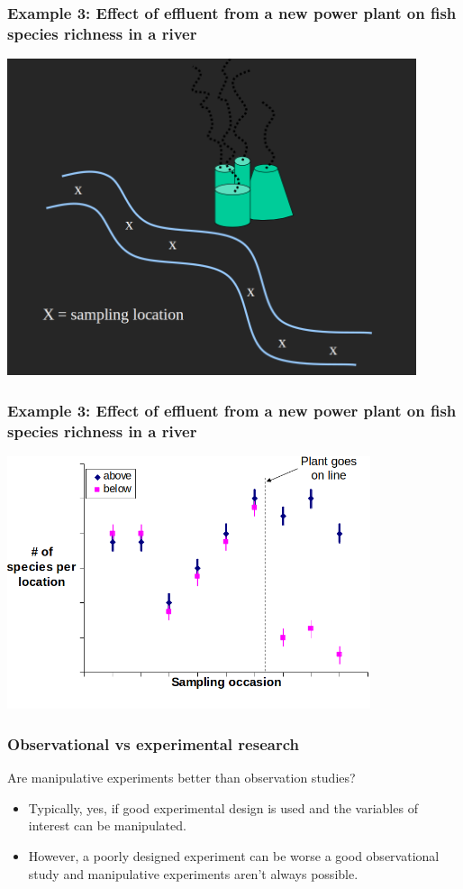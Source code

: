 \documentclass[color=usenames,dvipsnames]{beamer}\usepackage[]{graphicx}\usepackage[]{color}
\begin{document}
\begin{frame}
  \frametitle{Example 3: Effect of effluent from a new power plant on
    fish species richness in a river}
  \centering
  \includegraphics[width=0.9\textwidth]{power-plant-river} \\
\end{frame}


\begin{frame}
  \frametitle{Example 3: Effect of effluent from a new power plant on
    fish species richness in a river}
  \centering
  \includegraphics[width=0.8\textwidth]{power-plant} \\
\end{frame}




\begin{frame}
  \frametitle{Observational vs experimental research}
  Are manipulative experiments better than observation studies? \\
  \begin{itemize}
    \item Typically, yes, if good experimental design is used and the
      variables of interest can be manipulated.
    \item However, a poorly designed experiment can be worse a good
      observational study and manipulative experiments aren't always
      possible. 
  \end{itemize}
\end{frame}
\end{document}
